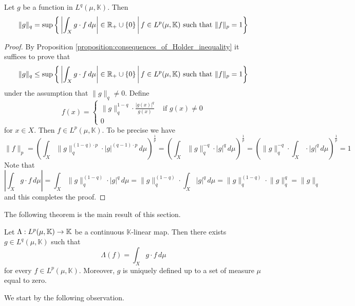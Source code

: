 \begin{proposition}\label{proposition:extremal_inequality_p_greater_one}
  Let $g$ be a function in $L^q(\mu,\mathbb{K})$. Then
  $$\lVert g\rVert_q = \sup \bigg\{\left|\int_X g\cdot f\,d\mu\right|\in {\mathbb R}_+\cup \{0\}\,\bigg|\,f\in L^p(\mu,\mathbb{K})\mbox{ such that }\lVert f\rVert_p = 1\bigg\}$$
\end{proposition}
\begin{proof}
  By Proposition \ref{proposition:consequences_of_Holder_inequality} it suffices to prove that
  $$\lVert g\rVert_q \leq \sup \bigg\{\left|\int_X g\cdot f\,d\mu\right|\in {\mathbb R}_+\cup \{0\}\,\bigg|\,f\in L^p(\mu,\mathbb{K})\mbox{ such that }\lVert f\rVert_p = 1\bigg\}$$
  under the assumption that $\lVert g \rVert_q \neq 0$. Define
  $$f(x) = \begin{cases}
      \lVert g \rVert_q^{1 - q}\cdot \frac{|g(x)|^q}{g(x)} & \mbox{ if }g(x) \neq 0 \\
      0
    \end{cases}
  $$
  for $x \in X$. Then $f \in L^p(\mu,\mathbb{K})$. To be precise we have
  $$\lVert f \rVert_p = \left(\int_X\lVert g \rVert_q^{(1 - q)\cdot p}\cdot |g|^{(q-1)\cdot p}\,d\mu\right)^{\frac{1}{p}} = \left(\int_X\lVert g \rVert_q^{-q}\cdot |g|^{q}\,d\mu\right)^{\frac{1}{p}} = \left(\lVert g \rVert_q^{-q}\cdot \int_X\cdot |g|^{q}\,d\mu\right)^{\frac{1}{p}} = 1
  $$
  Note that
  $$\left|\int_X g\cdot f\,d\mu\right| = \int_X \lVert g \rVert_q^{(1 - q)}\cdot |g|^{q}\,d\mu = \lVert g \rVert_q^{(1 - q)}\cdot \int_X |g|^{q}\,d\mu = \lVert g \rVert_q^{(1 - q)}\cdot \lVert g \rVert_q^{q} = \lVert g \rVert_q $$
  and this completes the proof.
\end{proof}
\noindent
The following theorem is the main result of this section.

\begin{theorem}\label{theorem:dual_to_L_p_for_p_in_(1_00)}
  Let $\Lambda:L^p(\mu,\mathbb{K})\rightarrow \mathbb{K}$ be a continuous $\mathbb{K}$-linear map. Then there exists $g \in L^q(\mu,\mathbb{K})$ such that
  $$\Lambda(f) = \int_Xg\cdot f\,d\mu$$
  for every $f \in L^p(\mu,\mathbb{K})$. Moreover, $g$ is uniquely defined up to a set of measure $\mu$ equal to zero.
\end{theorem}
\noindent
We start by the following observation.

